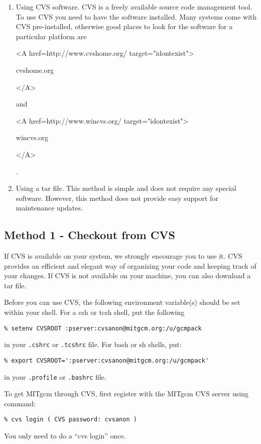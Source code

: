 \begin{enumerate}
\item Using CVS software. CVS is a freely available source code management
tool. To use CVS you need to have the software installed. Many systems
come with CVS pre-installed, otherwise good places to look for
the software for a particular platform are
\begin{rawhtml} <A href=http://www.cvshome.org/ target="idontexist"> \end{rawhtml}
cvshome.org
\begin{rawhtml} </A> \end{rawhtml}
and
\begin{rawhtml} <A href=http://www.wincvs.org/ target="idontexist"> \end{rawhtml}
wincvs.org
\begin{rawhtml} </A> \end{rawhtml}
.

\item Using a tar file. This method is simple and does not
require any special software. However, this method does not
provide easy support for maintenance updates.

\end{enumerate}

\subsection{Method 1 - Checkout from CVS}
\label{sec:cvs_checkout}

If CVS is available on your system, we strongly encourage you to use it. CVS
provides an efficient and elegant way of organizing your code and keeping
track of your changes. If CVS is not available on your machine, you can also
download a tar file.

Before you can use CVS, the following environment variable(s) should
be set within your shell.  For a csh or tcsh shell, put the following 
\begin{verbatim}
% setenv CVSROOT :pserver:cvsanon@mitgcm.org:/u/gcmpack
\end{verbatim}
in your \texttt{.cshrc} or \texttt{.tcshrc} file.  For bash or sh
shells, put:
\begin{verbatim}
% export CVSROOT=':pserver:cvsanon@mitgcm.org:/u/gcmpack'
\end{verbatim}
in your \texttt{.profile} or \texttt{.bashrc} file.


To get MITgcm through CVS, first register with the MITgcm CVS server
using command:
\begin{verbatim}
% cvs login ( CVS password: cvsanon )
\end{verbatim}
You only need to do a ``cvs login'' once.

